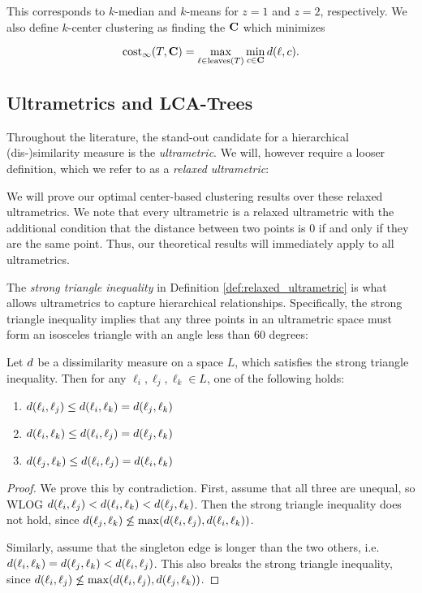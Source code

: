 \noindent This corresponds to $k$-median and $k$-means for $z=1$ and $z=2$, respectively. We also define $k$-center clustering as finding the $\mathbf{C}$ which
minimizes

\[ \text{cost}_\infty(T, \mathbf{C}) = \max_{\ell \in \text{leaves}(T)} \min_{c \in \mathbf{C}} d(\ell, c). \]

\subsection{Ultrametrics and LCA-Trees}
\label{app:ultrametric_proofs}

Throughout the literature, the stand-out candidate for a hierarchical (dis-)similarity measure is the \emph{ultrametric}. We will, however require a looser
definition, which we refer to as a \emph{relaxed ultrametric}:

\RelaxedUltrametric*

\noindent We will prove our optimal center-based clustering results over these relaxed ultrametrics. We note that every ultrametric is a relaxed
ultrametric with the additional condition that the distance between two points is $0$ if and only if they are the same point. Thus, our theoretical results will
immediately apply to all ultrametrics.

The \emph{strong triangle inequality} in Definition \ref{def:relaxed_ultrametric} is what allows ultrametrics to capture hierarchical relationships. Specifically, the strong triangle inequality implies that any three points in an ultrametric space must form an isosceles triangle with an angle less than 60 degrees:

\begin{fact}
    \label{fact:isosceles}
    Let $d$ be a dissimilarity measure on a space $L$, which satisfies the strong triangle inequality. Then for any $\ell_i, \ell_j, \ell_k \in L$, one
    of the following holds:
    \begin{enumerate}
        \item $d(\ell_i, \ell_j) \leq d(\ell_i, \ell_k) = d(\ell_j, \ell_k)$
        \item $d(\ell_i, \ell_k) \leq d(\ell_i, \ell_j) = d(\ell_j, \ell_k)$
        \item $d(\ell_j, \ell_k) \leq d(\ell_i, \ell_j) = d(\ell_i, \ell_k)$
    \end{enumerate}
\end{fact}
\begin{proof}
    We prove this by contradiction. First, assume that all three are unequal, so WLOG $d(\ell_i, \ell_j) < d(\ell_i, \ell_k) < d(\ell_j,
    \ell_k)$. Then the strong triangle inequality does not hold, since $d(\ell_j, \ell_k) \not\leq \max(d(\ell_i, \ell_j), d(\ell_i, \ell_k))$.

    Similarly, assume that the singleton edge is longer than the two others, i.e. $d(\ell_i, \ell_k) = d(\ell_j, \ell_k) < d(\ell_i, \ell_j)$. This also
    breaks the strong triangle inequality, since $d(\ell_i, \ell_j) \not\leq \max(d(\ell_i, \ell_j), d(\ell_j, \ell_k))$.
\end{proof}

